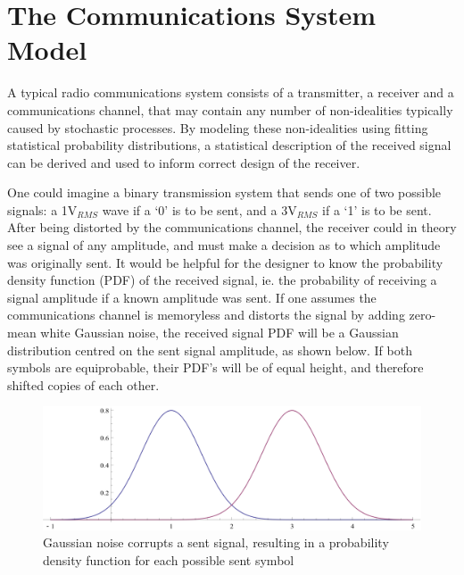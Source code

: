 \section{The Communications System Model}

A typical radio communications system consists of a transmitter, a
receiver and a communications channel, that may contain any number of
non-idealities typically caused by stochastic processes. By modeling these non-idealities using fitting statistical probability distributions, a statistical description of the received signal can be derived and used to inform correct design of the receiver.

One could imagine a binary transmission system that sends one of two
possible signals: a 1V$_{RMS}$ wave if a `0' is to be sent, and a
3V$_{RMS}$ if a `1' is to be sent. After being distorted by the
communications channel, the receiver could in theory see a signal of any
amplitude, and must make a decision as to which amplitude was originally
sent. It would be helpful for the designer to know the probability density function (PDF)
of the received signal, ie. the probability of receiving a signal
amplitude if a known amplitude was sent. If one assumes the communications
channel is memoryless and distorts the signal by adding zero-mean white Gaussian noise,
the received signal PDF will be a Gaussian distribution centred on the
sent signal amplitude, as shown below. If both symbols are equiprobable, their PDF's will be of equal height, and therefore shifted copies of each other.

\begin{figure}[htbp]
\centering
\includegraphics[width=\linewidth]{4-PAM_PDF.png}
\caption[Ideal received signal PDF]{Gaussian noise corrupts a sent signal, resulting in a
probability density function for each possible sent symbol}
\end{figure}

